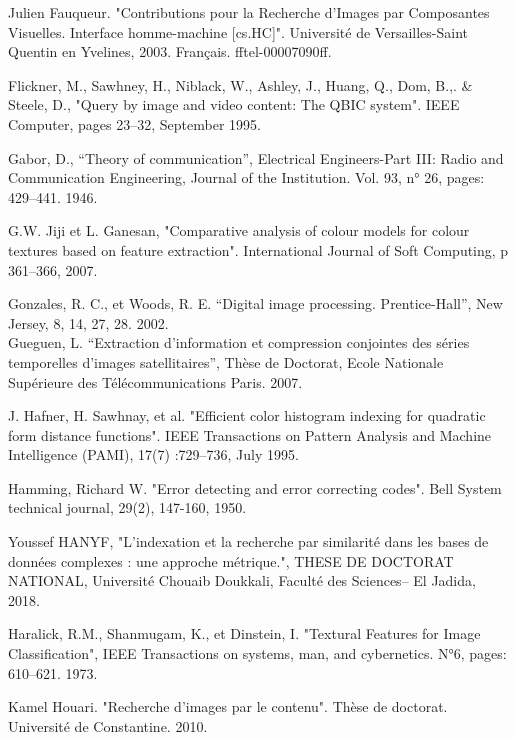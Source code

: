 \documentclass[
openany,
11pt, %
french, %
singlespacing, %
headsepline, %
]{MastersDoctoralThesis} %
\begin{document}
\begin{thebibliography}{widest entry}
	
	  Julien Fauqueur. "Contributions pour la Recherche d’Images par Composantes Visuelles. Interface homme-machine [cs.HC]". Université de Versailles-Saint Quentin en Yvelines, 2003. Français. ﬀtel-00007090ﬀ.
	
	
	  Flickner, M., Sawhney, H., Niblack, W., Ashley, J., Huang, Q., Dom, B.,. \& Steele, D., "Query by image and video content: The QBIC system". IEEE Computer, pages 23–32, September 1995.
	
	 Gabor, D., “Theory of communication”, Electrical Engineers-Part III: Radio and Communication Engineering, Journal of the Institution. Vol. 93, n° 26, pages: 429–441. 1946.
	
	 G.W. Jiji et L. Ganesan, "Comparative analysis of colour models for colour textures based on feature extraction". International Journal of Soft Computing, p 361–366, 2007.
	
	 Gonzales, R. C., et Woods, R. E. “Digital image processing. Prentice-Hall”, New Jersey, 8, 14, 27, 28. 2002.\\
	
	 Gueguen, L. “Extraction d’information et compression conjointes des séries temporelles d’images satellitaires”, Thèse de Doctorat, Ecole Nationale Supérieure des Télécommunications Paris. 2007.
	
	 J. Hafner, H. Sawhnay, et al. "Efficient color histogram indexing for quadratic form distance functions". IEEE Transactions on Pattern Analysis and Machine Intelligence (PAMI), 17(7) :729–736, July 1995.
	
	 Hamming, Richard W. "Error detecting and error correcting codes". Bell System technical journal, 29(2), 147-160, 1950.
	
	  Youssef HANYF, "L'indexation et la recherche par similarité dans les bases de données complexes : une approche métrique.", THESE DE DOCTORAT NATIONAL, Université Chouaib Doukkali, Faculté des Sciences– El Jadida, 2018.
	
	 Haralick, R.M., Shanmugam, K., et Dinstein, I. "Textural Features for Image Classification", IEEE Transactions on systems, man, and cybernetics. N°6, pages: 610–621. 1973.
	
	 Kamel Houari. "Recherche d’images par le contenu". Thèse de doctorat. Université de Constantine. 2010.
	

\end{thebibliography}
\end{document}
